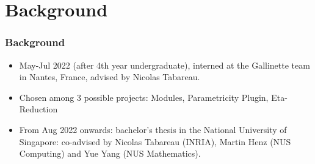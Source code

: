 \section{Background}
\label{sec:background}

\begin{frame}
    \frametitle{Background}

    \begin{itemize}
    \item May-Jul 2022 (after 4th year undergraduate), interned at the Gallinette
        team in Nantes, France, advised by Nicolas Tabareau.
    \item Chosen among 3 possible projects: Modules, Parametricity Plugin,
        Eta-Reduction
    \item From Aug 2022 onwards: bachelor's thesis in the National University of
        Singapore: co-advised by Nicolas Tabareau (INRIA), Martin Henz (NUS
        Computing) and Yue Yang (NUS Mathematics).
    \end{itemize}

\end{frame}